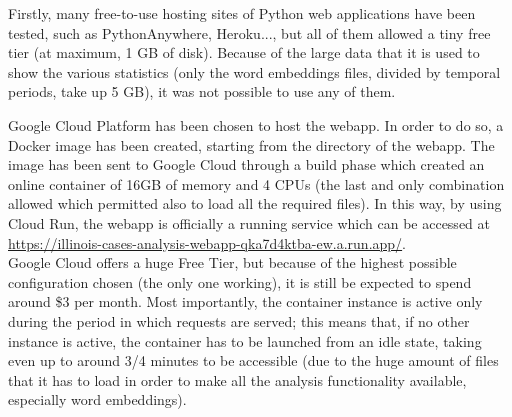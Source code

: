 Firstly, many free-to-use hosting sites of Python web applications have been tested, such as PythonAnywhere, Heroku...,
but all of them allowed a tiny free tier (at maximum, 1 GB of disk). Because of the large data that it is used to
show the various statistics (only the word embeddings files, divided by temporal periods, take up 5 GB), it was not
possible to use any of them.

Google Cloud Platform has been chosen to host the webapp. In order to do so, a Docker image has been created, starting
from the directory of the webapp. The image has been sent to Google Cloud through a build phase which created an online
container of 16GB of memory and 4 CPUs (the last and only combination allowed which permitted also to load all the
required files). In this way, by using Cloud Run, the webapp is officially a running service which can be accessed at
\url{https://illinois-cases-analysis-webapp-qka7d4ktba-ew.a.run.app/}.\\
Google Cloud offers a huge Free Tier, but because of the highest possible configuration chosen (the only one working),
it is still be expected to spend around \$3 per month. Most importantly, the container instance is active only during the
period in which requests are served; this means that, if no other instance is active, the container has to be launched
from an idle state, taking even up to around 3/4 minutes to be accessible (due to the huge amount of files that it
has to load in order to make all the analysis functionality available, especially word embeddings).